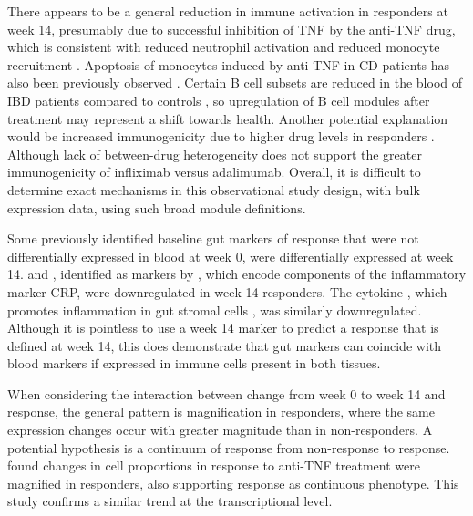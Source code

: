 There appears to be a general reduction in immune activation in responders at week 14,
presumably due to successful inhibition of \gls{TNF} by the anti-\gls{TNF} drug,
which is consistent with reduced neutrophil activation and reduced monocyte recruitment \autocite{pramekumar2018PartnersCrimeNeutrophils}.
Apoptosis of monocytes induced by anti-\gls{TNF} in \gls{CD} patients has also been previously observed \autocite{lugering2001InfliximabInducesApoptosis}.
Certain B cell subsets are reduced in the blood of \gls{IBD} patients compared to controls \autocite{pararasa2019ReducedCD27IgDCells}, 
so upregulation of B cell modules after treatment may represent a shift towards health.
Another potential explanation would be increased immunogenicity due to higher drug levels in responders \autocite{kennedy2019PredictorsAntiTNFTreatment}.
Although lack of between-drug heterogeneity does not support the greater immunogenicity of infliximab versus adalimumab.
Overall, it is difficult to determine exact mechanisms in this observational study design, with bulk expression data, using such broad module definitions.

Some previously identified baseline gut markers of response that were not differentially expressed in blood at week 0, were differentially expressed at week 14.
 and , identified as markers by \textcite{arijs2010PredictiveValueEpithelial}, which encode components of the inflammatory marker \gls{CRP}, were downregulated in week 14 responders.
The cytokine , which promotes inflammation in gut stromal cells \autocite{west2017OncostatinDrivesIntestinal}, was similarly downregulated.
Although it is pointless to use a week 14 marker to predict a response that is defined at week 14,
this does demonstrate that gut markers can coincide with blood markers if expressed in immune cells present in both tissues.

When considering the interaction between change from week 0 to week 14 and response,
the general pattern is magnification in responders,
where the same expression changes occur with greater magnitude than in non-responders.
A potential hypothesis is a continuum of response from non-response to response.
\textcite{gaujoux2019CellcentredMetaanalysisReveals} found changes in cell proportions in response to anti-\gls{TNF} treatment were magnified in responders, 
also supporting response as continuous phenotype.
This study confirms a similar trend at the transcriptional level.


